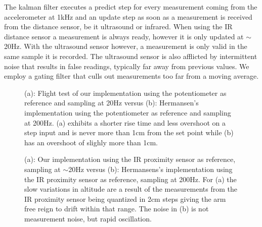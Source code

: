 The kalman filter executes a predict step for every measurement coming from the accelerometer at 1kHz and an update step as soon 
as a measurement is received from the distance sensor, be it ultrasound or infrared. When using the IR distance 
sensor a measurement is always ready, however it is only updated at
\(\sim\)20Hz. With the ultrasound sensor however, a measurement is only valid in the same sample it is recorded. The ultrasound sensor is also afflicted by intermittent noise that results in false readings,
typically far away from previous values. We employ a gating filter that culls out measurements too far from a moving average.
\begin{figure}
	\centering
	\subfloat[][]{\newlength\figureheight
		\newlength\figurewidth
		\setlength\figureheight{4cm}
		\setlength\figurewidth{7cm}
		
	}
	\subfloat[][]{\setlength\figureheight{4cm}
		\setlength\figurewidth{7cm}
		
	}
	\caption{(a): Flight test of our implementation using the potentiometer as reference and sampling at 20Hz versus (b):
	Hermansen's implementation using the potentiometer as reference and sampling at 200Hz. (a) exhibits a shorter rise time and less
	overshoot on a step input and is never more than 1cm from the set point while (b) has an overshoot of slighly more than 1cm.}
	\label{fig:pottest}
	\vspace{3pt}
	\hrulefill
\end{figure}
\begin{figure}
	\centering
	\subfloat[][]{\setlength\figureheight{4cm}
		\setlength\figurewidth{6cm}
		
	}
	\subfloat[][]{\setlength\figureheight{4cm}
		\setlength\figurewidth{6cm}
		
	}
	\caption{(a): Our implementation using the IR proximity sensor as reference, sampling at \(\sim\)20Hz versus (b): 
	Hermansens's implementation using the IR proximity sensor as reference, sampling at 200Hz. For (a) the slow variations in 
altitude are a result of the measurements from the IR proximity sensor being quantized in 2cm steps giving the arm
free reign to drift within that range. The noise in (b) is not measurement noise, but rapid oscillation.}
\label{fig:irtest}
\vspace{3pt}
\hrulefill
\end{figure}

